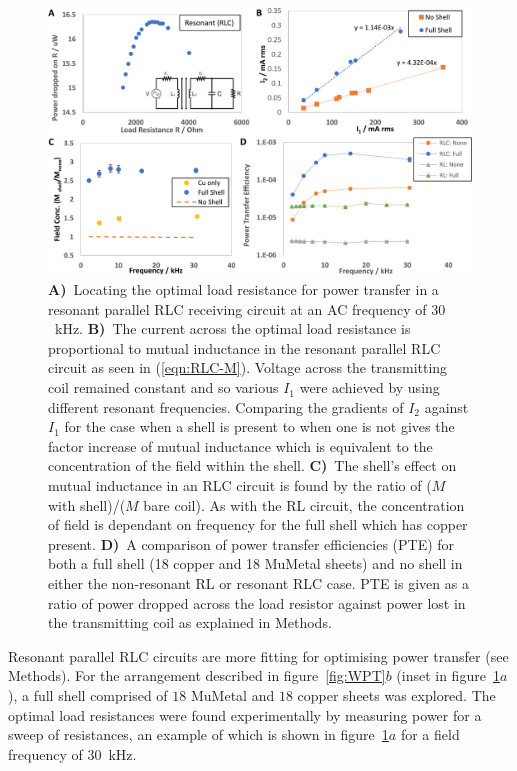 \documentclass[11pt]{iopart}
\begin{document}
\begin{figure}
  \begin{center}
   \noindent\includegraphics[width=0.9\linewidth]{images/compoundRLC-inset.pdf}
  \end{center}
  \caption{
    \textbf{A)}~Locating the optimal load resistance for power transfer in a resonant
    parallel RLC receiving circuit at an AC frequency of $30$~kHz.
    \textbf{B)}~The current across the optimal load resistance is proportional to
    mutual inductance in the resonant parallel RLC circuit as seen in
    (\ref{eqn:RLC-M}). Voltage across the transmitting coil
    remained constant and so various $I_1$ were achieved by using
    different resonant frequencies. Comparing the gradients of $I_2$
    against $I_1$ for the case when a shell is present to when one is
    not gives the factor increase of mutual inductance which
    is equivalent to the concentration of the field within the shell.
    \textbf{C)}~The shell's effect on mutual inductance in an RLC circuit is
    found by the ratio of ($M$ with shell)/($M$ bare coil). As with
    the RL circuit, the concentration of field is dependant on
    frequency for the full shell which has copper present.
    \textbf{D)}~A comparison of power transfer efficiencies (PTE) for both a
    full shell (18 copper and 18 MuMetal sheets) and no shell in either
    the non-resonant RL or resonant RLC case. PTE is given as a ratio of power dropped
    across the load resistor against power lost in the transmitting
    coil as explained in Methods.
  }
  \label{fig:cpdRLC}
  \vspace{-0.7em}
\end{figure}

Resonant parallel RLC circuits are more fitting for optimising power
transfer (see Methods). For the arrangement
described in figure~\ref{fig:WPT}$b$ (inset in figure~\ref{fig:cpdRLC}$a$), a full shell comprised of $18$
MuMetal and $18$ copper sheets was explored. The optimal load
resistances were found experimentally by measuring power for a sweep
of resistances, an example of which is shown in
figure~\ref{fig:cpdRLC}$a$ for a field frequency of $30$~kHz.
\end{document}

